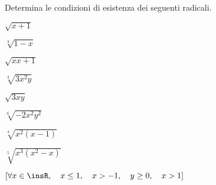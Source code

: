 \begin{esercizio}
 \label{ese:2.11}
Determina le condizioni di esistenza dei seguenti radicali.
 \begin{multicols}{4}
 \begin{enumeratea}
 \item $\sqrt{x+1}$
 \item $\sqrt[3]{1-x}$
 \item $\sqrt{x{x+1}}$
 \item $\sqrt[3]{3x^2y}$
 \item $\sqrt{3xy}$
 \item $\sqrt[6]{-2x^2y^2}$
 \item $\sqrt[4]{x^2(x-1)}$
 \item $\sqrt[5]{x^3(x^2-x)}$
 \end{enumeratea}
 \end{multicols}
\begin{flushright}
\vspace*{-8pt}
$[\forall x\in \insR,\quad x\le 1,\quad x>-1,\quad y\ge 0,\quad x>1]$
\end{flushright}
\end{esercizio}

